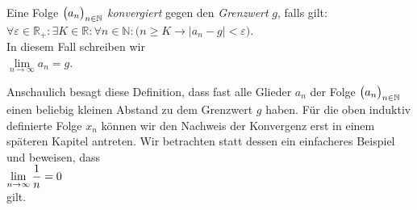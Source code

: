 \begin{table}[!h]
  \centering
{}
  \caption{Die ersten 39 Glieder der durch $x_1 = 1$ und $x_{n+1} = \cos(x_n)$ definierten Folge.}
  \label{tab:x-cos-x}
\end{table} 

\begin{Definition}
\hspace*{\fill} \\
Eine Folge $\bigl(a_n\bigr)_{n\in\mathbb{N}}$ \emph{konvergiert} gegen den \emph{Grenzwert} $g$, falls gilt:
\\[0.2cm]
\hspace*{1.3cm}
$\forall \varepsilon \in\mathbb{R}_+: \exists K \in \mathbb{R}: \forall n \in \mathbb{N}:\bigl( n \geq K \rightarrow |a_n - g| < \varepsilon\bigr)$. 
\\[0.2cm]
In diesem Fall schreiben wir
\\[0.2cm]
\hspace*{1.3cm}
$\lim\limits_{n\rightarrow\infty} a_n = g$.  \eod
\end{Definition}
Anschaulich besagt diese Definition, dass fast alle Glieder $a_n$ der Folge $\bigl(a_n\bigr)_{n\in\mathbb{N}}$
einen beliebig kleinen Abstand zu dem Grenzwert $g$ haben.
F\"ur die oben induktiv definierte Folge $x_n$ k\"onnen wir den Nachweis der Konvergenz erst
in einem sp\"ateren Kapitel antreten.  Wir betrachten statt dessen ein einfacheres Beispiel
und beweisen, dass 
\\[0.2cm]
\hspace*{1.3cm}
$\displaystyle\lim\limits_{n\rightarrow\infty} \frac{1}{n} = 0$
\\[0.2cm]
gilt. 
\pagebreak

